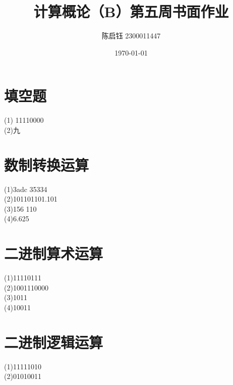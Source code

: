 \documentclass{ctexart}
\title{计算概论（B）第五周书面作业}
\author{陈启钰\,\,2300011447}
\date{\today}
\begin{document}
	\maketitle
	\section{填空题}
	\noindent (1) 11110000
	\\
	(2)九
	\section{数制转换运算}
	\noindent (1)3adc 35334
	\\
	(2)101101101.101
	\\
	(3)156 110
	\\
	(4)6.625
	\section{二进制算术运算}
	\noindent
	(1)11110111
	\\
	(2)1001110000
	\\
	(3)1011
	\\
	(4)10011
	\section{二进制逻辑运算}
	\noindent
	(1)11111010
	\\
	(2)01010011
\end{document}
